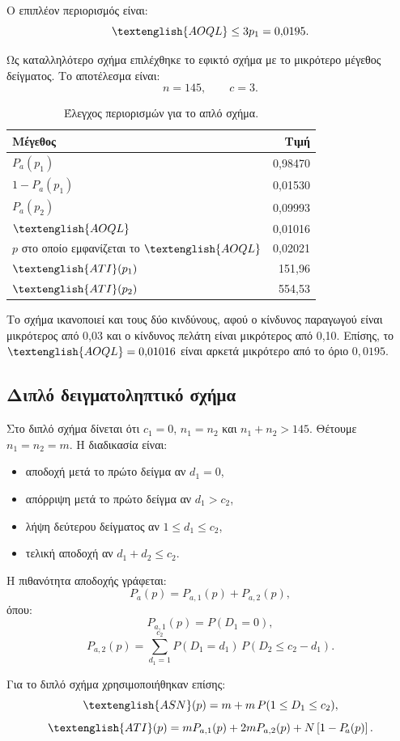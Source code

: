\documentclass[12pt,a4paper]{article}
\newcommand{\Pa}{P_{\!a}}
\newcommand{\AOQL}{\textenglish{AOQL}}
\newcommand{\ATI}{\textenglish{ATI}}
\newcommand{\ASN}{\textenglish{ASN}}
\begin{document}
Ο επιπλέον περιορισμός είναι:
\[
    \AOQL \le 3p_1 = 0{,}0195.
\]

Ως καταλληλότερο σχήμα επιλέχθηκε το εφικτό σχήμα με το μικρότερο μέγεθος
δείγματος. Το αποτέλεσμα είναι:
\[
    \boxed{n=145,\qquad c=3}.
\]

\begin{table}[H]
\centering
\caption{Έλεγχος περιορισμών για το απλό σχήμα.}
\begin{tabular}{lr}
\toprule
\textbf{Μέγεθος} & \textbf{Τιμή} \\
\midrule
\(\Pa(p_1)\) & 0,98470 \\
\(1-\Pa(p_1)\) & 0,01530 \\
\(\Pa(p_2)\) & 0,09993 \\
\(\AOQL\) & 0,01016 \\
\(p\) στο οποίο εμφανίζεται το \(\AOQL\) & 0,02021 \\
\(\ATI(p_1)\) & 151,96 \\
\(\ATI(p_2)\) & 554,53 \\
\bottomrule
\end{tabular}
\end{table}

Το σχήμα ικανοποιεί και τους δύο κινδύνους, αφού ο κίνδυνος παραγωγού είναι
μικρότερος από 0,03 και ο κίνδυνος πελάτη είναι μικρότερος από 0,10. Επίσης,
το \(\AOQL=0{,}01016\) είναι αρκετά μικρότερο από το όριο \(0{,}0195\).

\subsection{Διπλό δειγματοληπτικό σχήμα}

Στο διπλό σχήμα δίνεται ότι \(c_1=0\), \(n_1=n_2\) και \(n_1+n_2>145\). Θέτουμε
\(n_1=n_2=m\). Η διαδικασία είναι:
\begin{itemize}[nosep]
    \item αποδοχή μετά το πρώτο δείγμα αν \(d_1=0\),
    \item απόρριψη μετά το πρώτο δείγμα αν \(d_1>c_2\),
    \item λήψη δεύτερου δείγματος αν \(1\le d_1\le c_2\),
    \item τελική αποδοχή αν \(d_1+d_2\le c_2\).
\end{itemize}

Η πιθανότητα αποδοχής γράφεται:
\[
    \Pa(p)=P_{a,1}(p)+P_{a,2}(p),
\]
όπου:
\[
    P_{a,1}(p)=P(D_1=0),
\]
\[
    P_{a,2}(p)=\sum_{d_1=1}^{c_2}P(D_1=d_1)\,
    P(D_2\le c_2-d_1).
\]

Για το διπλό σχήμα χρησιμοποιήθηκαν επίσης:
\[
    \ASN(p)=m+m\,P(1\le D_1\le c_2),
\]
\[
    \ATI(p)=mP_{a,1}(p)+2mP_{a,2}(p)+N\left[1-\Pa(p)\right].
\]
\end{document}
